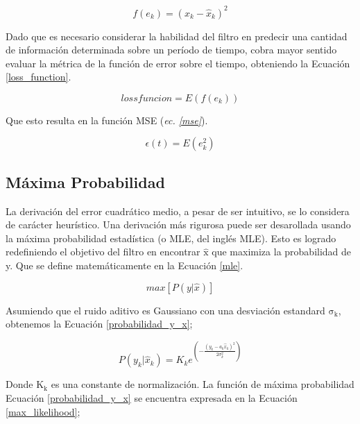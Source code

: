 \documentclass[10pt,a4paper]{article}
\begin{document}
\begin{itemize}
\begin{equation}
    f(e_k) = (x_k - \hat{x}_k)^2 \label{error_cuadratico}
\end{equation}

Dado que es necesario considerar la habilidad del filtro en predecir una
cantidad de informaci\'on determinada sobre un per\'iodo de tiempo, cobra mayor
sentido evaluar la m\'etrica de la funci\'on de error sobre el tiempo,
obteniendo la Ecuaci\'on \ref{loss_function}.

\begin{equation}
    lossfuncion = E\left(f(e_k)\right) \label{loss_function}
\end{equation}

Que esto resulta en la funci\'on \acrshort{MSE} (\emph{ec. \ref{mse}}).

\begin{equation}
    \epsilon(t) = E(e^2_k) \label{mse}
\end{equation}

\subsection{M\'axima Probabilidad}\label{maximum_likelihood_section}

La derivaci\'on del error cuadr\'atico medio, a pesar de ser intuitivo, se lo
considera de car\'acter heur\'istico. Una derivaci\'on m\'as rigurosa puede ser
desarollada usando la m\'axima probabilidad estad\'istica (o \acrshort{MLE}, del
ingl\'es \acrlong{MLE}). Esto es logrado redefiniendo el objetivo del filtro en
encontrar $\mathrm{\hat{x}}$ que maximiza la probabilidad de y. Que se define
matem\'aticamente en la Ecuaci\'on \ref{mle}.

\begin{equation}
    max\left[P\left(y|\hat{x}\right)\right] \label{mle}
\end{equation}

Asumiendo que el ruido aditivo es Gaussiano con una desviaci\'on estandard
$\mathrm{\sigma_k}$, obtenemos la Ecuaci\'on \ref{probabilidad_y_x};

\begin{equation}
    P\left(y_k|\hat{x}_k\right) = K_ke^{\left(- \frac{(y_k - a_k\hat{x}_k)^2}{2\sigma^2_k}\right)} \label{probabilidad_y_x}
\end{equation}

Donde $\mathrm{K_k}$ es una constante de normalizaci\'on. La funci\'on de
m\'axima probabilidad Ecuaci\'on \ref{probabilidad_y_x} se encuentra expresada
en la Ecuaci\'on \ref{max_likelihood};


\end{itemize}
\end{document}
